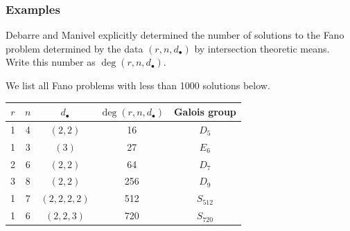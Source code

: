 \documentclass{beamer}
\theoremstyle{definition}
\newcommand{\new}[1]{{\color{black!15!blue}#1}}
\begin{document}
%
\begin{frame}
\frametitle{Examples}
Debarre and Manivel explicitly determined the number of solutions to the Fano problem determined by the data $(r,n,d_\bullet)$ by intersection theoretic means. Write this number as $\deg(r,n,d_\bullet)$.

We list all Fano problems with less than 1000 solutions below.

\begin{table}[htb]
  \label{Small Fano}
  \def\arraystretch{1.1}
  \begin{tabular}{||c|c|c|c|c||}
    \hline
    $r$ & $n$ & $d_\bullet$ & $\deg(r,n,d_\bullet)$ & Galois group\\
    \hline\hline
    1 & 4 & $(2,2)$ & 16 & $D_5$\\
    \hline
    1 & 3 & $(3)$ & 27 & $E_6$\\
    \hline
    2 & 6 & $(2,2)$ & 64 & $D_7$\\
    \hline
    3 & 8 & $(2,2)$ & 256 & $D_9$\\
    \hline
    1 & 7 & $(2,2,2,2)$ & 512 & \new{$S_{512}$}\\
    \hline
    1 & 6 & $(2,2,3)$ & 720  & \new{$S_{720}$}\\
    \hline
  \end{tabular}
\end{table}
\end{frame}
\end{document}
